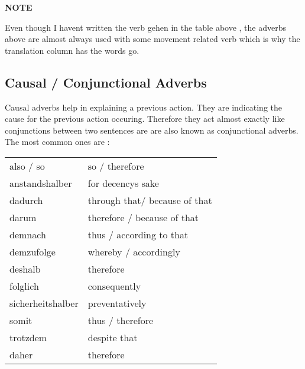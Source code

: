 \documentclass[a4paper,twocolumn,10pt]{article}
\newcommand{\subsectionend}
{
\nolinenumbers
\linenumbers
}
\newcommand{\subsubsectionend}
{
\nolinenumbers
\linenumbers
}
\newcommand{\tcolorboxstart}
{
	\nolinenumbers
	\vspace{0.2cm}
	\centering
}
\newcommand{\tcolorboxend}
{
	\justifying
	\vspace{0.2cm}
	\linenumbers
}
\newcommand{\tcolorboxnote}[1]
{

\tcolorboxstart
\begin{note-bg}

	\begin{note-theword}
		{\footnotesize \textbf{NOTE} }
	\end{note-theword}

	\begin{note-content} \justifying

		#1

	\end{note-content}

\end{note-bg}
\tcolorboxend
}
\newcommand{\tabularxtable}[3]
{

	\vspace{0.5cm}
	\nolinenumbers

	\begin{tabularx}{#1}{#2}
		#3
	\end{tabularx}

	\linenumbers
	\vspace{0.5cm}
}
\begin{document}



\tcolorboxnote
{
Even though I havent written the
verb gehen in the table above , the adverbs above are almost always used with
some movement related verb which is why the translation column has the words go.


}





\subsubsectionend

\subsectionend

\subsection{Causal / Conjunctional Adverbs}
\label{ssec:causal_conjunctional_adverbs}

Causal adverbs help in explaining a previous action. They are indicating the
cause for the previous action occuring. Therefore they act almost exactly like
conjunctions between two sentences are are also known as conjunctional adverbs.
The most common ones are :



\tabularxtable
{0.95\linewidth}
{lX}
{
\rowcolor{white}     also / so         & so / therefore \\
\rowcolor{lightgray} anstandshalber    & for decencys sake\\
\rowcolor{white}     dadurch           & through that/ because of that\\
\rowcolor{lightgray} darum             & therefore / because of that\\
\rowcolor{white}     demnach           & thus / according to that\\
\rowcolor{lightgray} demzufolge        & whereby / accordingly\\
\rowcolor{white}     deshalb           & therefore\\
\rowcolor{lightgray} folglich          & consequently\\
\rowcolor{white}     sicherheitshalber & preventatively\\
\rowcolor{lightgray} somit             & thus / therefore\\
\rowcolor{white}     trotzdem          & despite that\\
\rowcolor{lightgray} daher             & therefore\\


}
\end{document}

